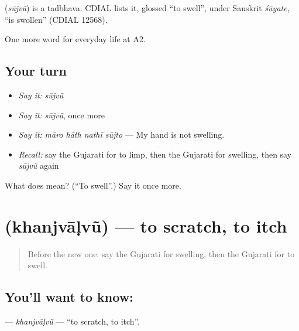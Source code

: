 \begin{cousinweb}
\textbf{} (\emph{sūjvũ}) is a tadbhava. CDIAL lists it, glossed \textquotedblleft{}to swell\textquotedblright{}, under Sanskrit \emph{śūyate}, \textquotedblleft{}is swollen\textquotedblright{} (CDIAL 12568).
\end{cousinweb}

\begin{grammarlens}[title={What you've built}]
One more word for everyday life at A2.
\end{grammarlens}

\subsection*{Your turn}
\begin{itemize}
\raggedright
  \item \emph{Say it:} \emph{sūjvũ}
  \item \emph{Say it:} \emph{sūjvũ}, once more
  \item \emph{Say it:} \emph{māro hāth nathī sūjto} — My hand is not swelling.
  \item \emph{Recall:} say the Gujarati for to limp, then the Gujarati for swelling, then say \emph{sūjvũ} again
\end{itemize}

\begin{tcolorbox}[breakable,colback=teal!4,colframe=teal!35!black,title={Before you move on}]
What does  mean? (\textquotedblleft{}To swell\textquotedblright{}.) Say it once more.
\end{tcolorbox}
\section[\texorpdfstring{\gu{ખંજવાળવું} (khanjvāḷvũ)}{ખંજવાળવું (khanjvāḷvũ)}]{ (khanjvāḷvũ) — to scratch, to itch}

\label{lesson:GU-C228-khanjvalvu}



\begin{quote}
Before the new one: say the Gujarati for swelling, then the Gujarati for to swell.
\end{quote}

\subsection*{You'll want to know: }
\textbf{} — \emph{khanjvāḷvũ} — \textquotedblleft{}to scratch, to itch\textquotedblright{}.

